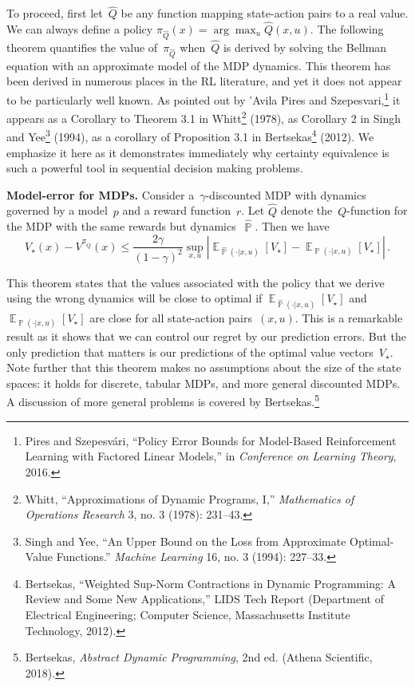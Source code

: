 \documentclass{tufte-book}
\begin{document}
To proceed, first let~\(\hat{Q}\) be any function mapping state-action
pairs to a real value. We can always define a policy
\(\pi_{\hat{Q}}(x) = \arg \max_u \hat{Q}(x,u)\). The following theorem
quantifies the value of~\(\pi_{\hat{Q}}\) when~\(\hat{Q}\) is derived by
solving the Bellman equation with an approximate model of the MDP
dynamics. This theorem has been derived in numerous places in the RL
literature, and yet it does not appear to be particularly well known. As
pointed out by 'Avila Pires and Szepesvari,\footnote{Pires and
  Szepesvári, {``Policy Error Bounds for Model-Based Reinforcement
  Learning with Factored Linear Models,''} in \emph{Conference on
  Learning Theory}, 2016.} it appears as a Corollary to Theorem 3.1 in
Whitt\footnote{Whitt, {``Approximations of Dynamic Programs, {I},''}
  \emph{Mathematics of Operations Research} 3, no. 3 (1978): 231--43.}
(1978), as Corollary 2 in Singh and Yee\footnote{Singh and Yee, {``An
  Upper Bound on the Loss from Approximate Optimal-Value Functions.''}
  \emph{Machine Learning} 16, no. 3 (1994): 227--33.} (1994), as a
corollary of Proposition 3.1 in Bertsekas\footnote{Bertsekas,
  {``Weighted Sup-Norm Contractions in Dynamic Programming: A Review and
  Some New Applications,''} LIDS Tech Report (Department of Electrical
  Engineering; Computer Science, Massachusetts Institute Technology,
  2012).} (2012). We emphasize it here as it demonstrates immediately
why certainty equivalence is such a powerful tool in sequential decision
making problems.

\begin{Theorem}

\textbf{Model-error for MDPs.} Consider a~\(\gamma\)-discounted MDP with
dynamics governed by a model~\(p\) and a reward function~\(r\). Let
\(\hat{Q}\) denote the~\(Q\)-function for the MDP with the same rewards
but dynamics~\(\hat{\mathop\mathbb{P}}\). Then we have \[
 V_\star(x)-V^{\pi_{\hat{Q}}}(x)  \leq \frac{2\gamma}{(1-\gamma)^2} \sup_{x,u} \left| \mathop\mathbb{E}_{\hat{\mathop\mathbb{P}}(\cdot|x,u)}[V_\star] - \mathop\mathbb{E}_{\mathop\mathbb{P} (\cdot|x,u)}[V_\star] \right|\,.
\]

\end{Theorem}

This theorem states that the values associated with the policy that we
derive using the wrong dynamics will be close to optimal if
\(\mathop\mathbb{E}_{\hat{\mathop\mathbb{P}}(\cdot|x,u)}[V_\star]\)
and~\(\mathop\mathbb{E}_{\mathop\mathbb{P} (\cdot|x,u)}[V_\star]\) are
close for all state-action pairs~\((x,u)\). This is a remarkable result
as it shows that we can control our regret by our prediction errors. But
the only prediction that matters is our predictions of the optimal value
vectors~\(V_\star\). Note further that this theorem makes no assumptions
about the size of the state spaces: it holds for discrete, tabular MDPs,
and more general discounted MDPs. A discussion of more general problems
is covered by Bertsekas.\footnote{Bertsekas, \emph{Abstract Dynamic
  Programming}, 2nd ed. (Athena Scientific, 2018).}
\end{document}
